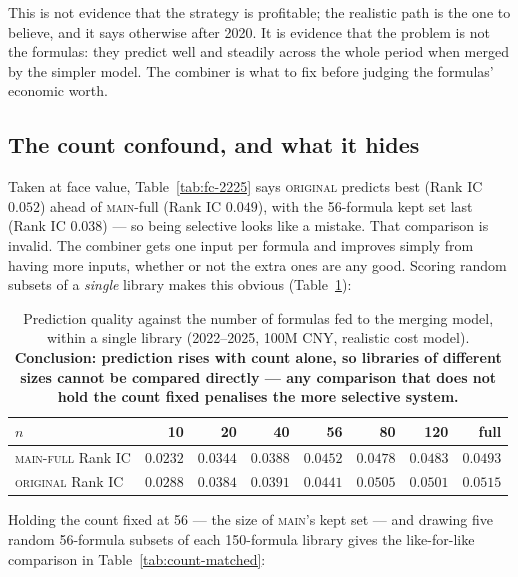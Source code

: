 \documentclass[11pt]{article}
\newcommand{\main}{\textsc{main}}
\newcommand{\orig}{\textsc{original}}
\begin{document}
This is not evidence that the strategy is profitable; the realistic path is the one to
believe, and it says otherwise after 2020. It is evidence that the problem is not the
formulas: they predict well and steadily across the whole period when merged by the
simpler model. The combiner is what to fix before judging the formulas' economic
worth.

\subsection{The count confound, and what it hides}
\label{sub:count}

Taken at face value, Table~\ref{tab:fc-2225} says \orig{} predicts best (Rank IC
$0.052$) ahead of \main{}-full (Rank IC $0.049$), with the 56-formula kept set last
(Rank IC $0.038$) --- so being selective looks like a mistake. That comparison is
invalid. The combiner gets one input per formula and improves simply from having more
inputs, whether or not the extra ones are any good. Scoring random subsets of a
\emph{single} library makes this obvious (Table~\ref{tab:count-curve}):

\begin{table}[h]
\centering\small
\setlength{\tabcolsep}{4pt}
\begin{tabular}{lrrrrrrr}
\toprule
$n$ & 10 & 20 & 40 & 56 & 80 & 120 & full \\
\midrule
\textsc{main-full} Rank IC & $0.0232$ & $0.0344$ & $0.0388$ & $0.0452$ & $0.0478$ & $0.0483$ & $0.0493$ \\
\textsc{original} Rank IC & $0.0288$ & $0.0384$ & $0.0391$ & $0.0441$ & $0.0505$ & $0.0501$ & $0.0515$ \\
\bottomrule
\end{tabular}
\caption{Prediction quality against the number of formulas fed to the merging model,
within a single library (2022--2025, 100M CNY, realistic cost model).
\textbf{Conclusion: prediction rises with count alone, so libraries of different sizes
cannot be compared directly --- any comparison that does not hold the count fixed
penalises the more selective system.}}
\label{tab:count-curve}
\end{table}

\noindent Holding the count fixed at 56 --- the size of \main{}'s kept set --- and
drawing five random 56-formula subsets of each 150-formula library gives the
like-for-like comparison in Table~\ref{tab:count-matched}:
\end{document}
